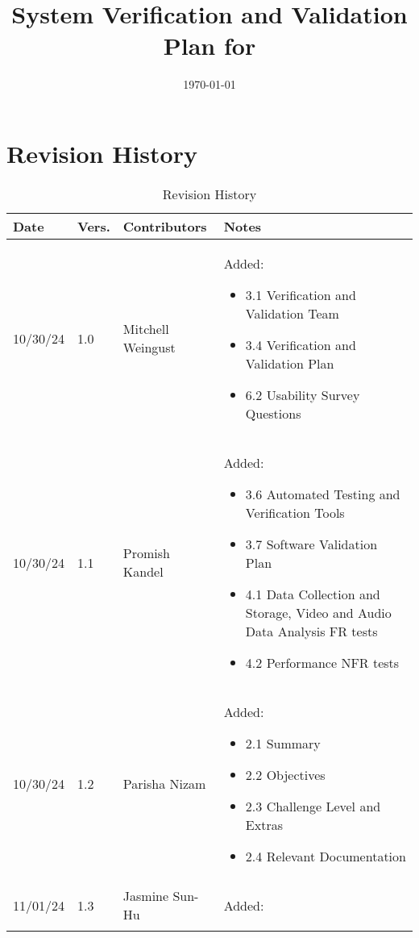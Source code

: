 \documentclass[12pt, titlepage]{article}
\begin{document}
\title{System Verification and Validation Plan for \progname{}} 
\author{\authname}
\date{\today}
	
\maketitle


\section*{Revision History}

\begin{table}[hp]
  \caption{Revision History} \label{TblRevisionHistory}
  \begin{tabularx}{\textwidth}{p{1.5cm}p{1cm}p{3.5cm}X}
  \toprule {\textbf{Date}} & {\textbf{Vers.}} & {\textbf{Contributors}} & {\textbf{Notes}}\\
  \midrule
  10/30/24 & 1.0 & Mitchell Weingust & Added:\begin{itemize}[leftmargin=*]
    \item 3.1 Verification and Validation Team
    \item 3.4 Verification and Validation Plan
    \item 6.2 Usability Survey Questions
  \end{itemize}\\
  10/30/24 & 1.1 & Promish Kandel & Added:\begin{itemize}[leftmargin=*]
    \item 3.6 Automated Testing and Verification Tools
    \item 3.7 Software Validation Plan
    \item 4.1 Data Collection and Storage, Video and Audio Data Analysis FR tests
    \item 4.2 Performance NFR tests
  \end{itemize}\\
  10/30/24 & 1.2 & Parisha Nizam & Added:\begin{itemize}[leftmargin=*]
    \item 2.1 Summary
    \item 2.2 Objectives
    \item 2.3 Challenge Level and Extras
    \item 2.4 Relevant Documentation
  \end{itemize}\\
  11/01/24 & 1.3 & Jasmine Sun-Hu & Added:\begin{itemize}[leftmargin=*]

\end{itemize}
\end{tabularx}
\end{table}
\end{document}
